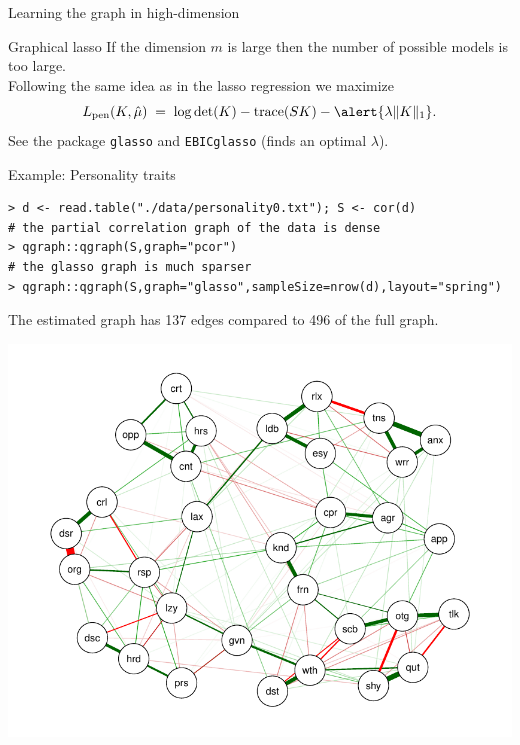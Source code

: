\documentclass[11pt,handout,aspectratio=169,dvipsnames]{beamer}
\begin{document}
\begin{frame}[fragile]{Learning the graph in high-dimension}
\begin{alertblock}{Graphical lasso}
	If the dimension $m$ is large then the number of possible models is too large.\\[.2cm]


Following the same idea as in the lasso regression we maximize
$$
L_{\rm pen}(K,\hat \mu)\;=\;\log\det (K)-\tr(SK)-\alert{\lambda \|K\|_1}.
$$
See the package \texttt{glasso} and \texttt{EBICglasso} (finds an optimal $\lambda$).
\end{alertblock}
\begin{block}{Example: Personality traits}
\begin{lstlisting}
> d <- read.table("./data/personality0.txt"); S <- cor(d)
# the partial correlation graph of the data is dense
> qgraph::qgraph(S,graph="pcor")
# the glasso graph is much sparser
> qgraph::qgraph(S,graph="glasso",sampleSize=nrow(d),layout="spring")
\end{lstlisting}
	The estimated graph has  137 edges compared to 496 of the full graph.
\end{block}
\end{frame}

\begin{frame}[plain,label=pers_lasso]{}
	\begin{center}
		\includegraphics[scale=.9]{pics/personality_lasso}
	\end{center}
\end{frame}
\end{document}

